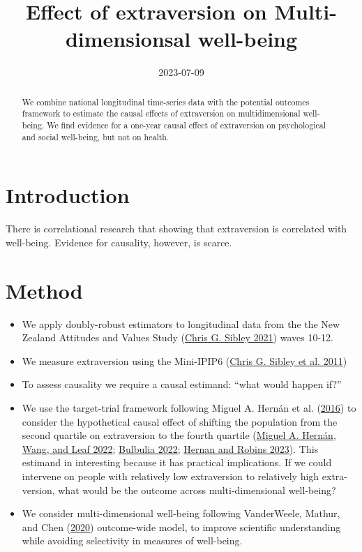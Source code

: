 \documentclass[
  singlecolumn]{report}
\title{Effect of extraversion on Multi-dimensionsal well-being}
\author{}
\date{2023-07-09}
\providecommand{\tightlist}{%
  \setlength{\itemsep}{0pt}\setlength{\parskip}{0pt}}\usepackage{longtable,booktabs,array}
\begin{document}
\maketitle
\begin{abstract}
We combine national longitudinal time-series data with the potential
outcomes framework to estimate the causal effects of extraversion on
multidimensional well-being. We find evidence for a one-year causal
effect of extraversion on psychological and social well-being, but not
on health.
\end{abstract}
\ifdefined\Shaded\renewenvironment{Shaded}{\begin{tcolorbox}[sharp corners, enhanced, breakable, boxrule=0pt, borderline west={3pt}{0pt}{shadecolor}, interior hidden, frame hidden]}{\end{tcolorbox}}\fi

\listoffigures
\listoftables
\hypertarget{introduction}{%
\section{Introduction}\label{introduction}}

There is correlational research that showing that extraversion is
correlated with well-being. Evidence for causality, however, is scarce.

\hypertarget{method}{%
\section{Method}\label{method}}

\begin{itemize}
\tightlist
\item
  We apply doubly-robust estimators to longitudinal data from the the
  New Zealand Attitudes and Values Study
  (\protect\hyperlink{ref-sibley2021}{Chris G. Sibley 2021}) waves
  10-12.
\item
  We measure extraversion using the Mini-IPIP6
  (\protect\hyperlink{ref-sibley2011}{Chris G. Sibley et al. 2011})
\item
  To assess causality we require a causal estimand: ``what would happen
  if?''
\item
  We use the target-trial framework following Miguel A. Hernán et al.
  (\protect\hyperlink{ref-hernuxe1n2016}{2016}) to consider the
  hypothetical causal effect of shifting the population from the second
  quartile on extraversion to the fourth quartile
  (\protect\hyperlink{ref-hernuxe1n2022}{Miguel A. Hernán, Wang, and
  Leaf 2022}; \protect\hyperlink{ref-bulbulia2022}{Bulbulia 2022};
  \protect\hyperlink{ref-hernan2023}{Hernan and Robins 2023}). This
  estimand in interesting because it has practical implications. If we
  could intervene on people with relatively low extraversion to
  relatively high extra-version, what would be the outcome across
  multi-dimensional well-being?
\item
  We consider multi-dimensional well-being following VanderWeele,
  Mathur, and Chen (\protect\hyperlink{ref-vanderweele2020}{2020})
  outcome-wide model, to improve scientific understanding while avoiding
  selectivity in measures of well-being.
\end{itemize}
\end{document}
